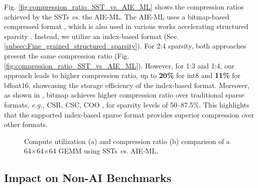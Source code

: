 Fig. \ref{fig:compression_ratio_SST_vs_AIE_ML} shows the compression ratios achieved by the SSTs \emph{vs.} the AIE-ML.
The AIE-ML uses a bitmap-based compressed format
\cite{AMD_AIE_ML_kernel_guide}, which is also used in various works accelerating structured sparsity \cite{S2TA_HPCA_2022, STA_arxiv_2020, N_M_sparse_transformers_FPGA_VLSI_2022, Fine_grained_Neural_ODE_FPGA_2023, LAMPS_FCCM_2024}.
Instead, we utilize an index-based format (Sec. \ref{subsec:Fine_grained_structured_sparsity}).
For 2:4 sparsity, both approaches present the same compression ratio (Fig. \ref{fig:compression_ratio_SST_vs_AIE_ML}).
However, for 1:3 and 1:4, our approach leads to higher compression ratio, up to \textbf{20\%} for int8 and \textbf{11\%} for bfloat16, showcasing the storage efficiency of the index-based format.
Moreover, as shown in \cite{N_M_sparse_transformers_FPGA_VLSI_2022}, bitmap achieves higher compression ratio over traditional sparse formats, \emph{e.g.,} CSR, CSC, COO \cite{Sparsity_Hoefler_2021}, for sparsity levels of 50--87.5\%.
This highlights that the supported index-based sparse format provides superior compression over other formats. 







\begin{figure}[t]
\vspace{-0.40cm}
\centering
{}
\hfill
{}

\vspace{-0.3cm}

\caption{Compute utilization (a) and compression ratio (b) comparison of a 64$\times$64$\times$64 GEMM using SSTs \emph{vs.} AIE-ML.}
\label{fig:utilization_compres_ratio_SST_vs_AIE_ML}
\vspace{-0.55cm}
\end{figure}


\subsection{Impact on Non-AI Benchmarks}
\label{subsec:Non_AI_benchmarks}


